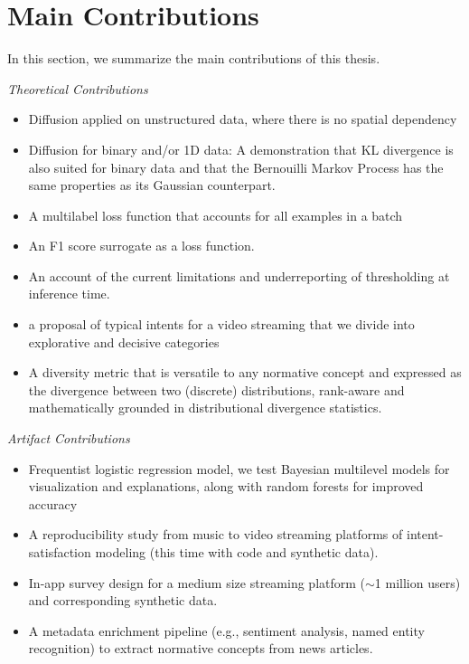 
\section{Main Contributions}
\label{section:introduction:contributions}

In this section, we summarize the main contributions of this thesis.

\emph{Theoretical Contributions}

\begin{itemize}
\item Diffusion applied on unstructured data, where there is no spatial dependency
\item Diffusion for binary and/or 1D data: A demonstration that KL divergence is also suited for binary data and that the Bernouilli Markov Process has the same properties as its Gaussian counterpart.
\item A multilabel loss function that accounts for all examples in a batch
\item An F1 score surrogate as a loss function.
\item An account of the current limitations and underreporting of thresholding at inference time.
\item a proposal of typical intents for a video streaming that we divide into explorative and decisive categories
\item A diversity metric that is versatile to any normative concept and expressed as the divergence between two (discrete) distributions, rank-aware and mathematically grounded in distributional divergence statistics.
\end{itemize}

\emph{Artifact Contributions}

\begin{itemize}
\item Frequentist logistic regression model, we test Bayesian multilevel models for visualization and explanations, along with random forests for improved accuracy
\item A reproducibility study from music to video streaming platforms of intent-satisfaction modeling (this time with code and synthetic data).
\item In-app survey design for a medium size streaming platform ($\sim$1 million users) and corresponding synthetic data.
\item A metadata enrichment pipeline (e.g., sentiment analysis, named entity recognition) to extract normative concepts from news articles.
\end{itemize}
